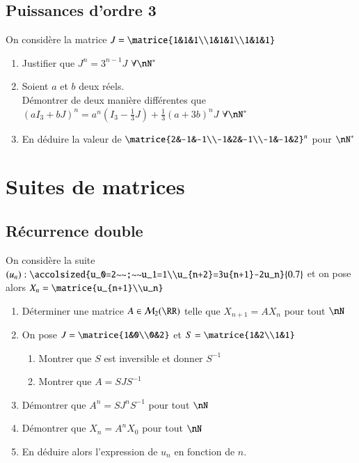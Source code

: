 \documentclass[oneside,12pt]{article}          %
\begin{document}
\subsection{Puissances d'ordre 3}
On considère la matrice $J=\matrice{1&1&1\\1&1&1\\1&1&1}$
\begin{enumerate}
    \item Justifier que $J^n=3^{n-1}J$ \quad $\forall \nN^*$
    \item Soient $a$ et $b$ deux réels.\\
    Démontrer de deux manière différentes que $(aI_3+bJ)^n=a^n(I_3-\frac{1}{3}J)+\frac{1}{3}(a+3b)^nJ$ \quad $\forall \nN^*$
    \item En déduire la valeur de $\matrice{2&-1&-1\\-1&2&-1\\-1&-1&2}^n$ pour $\nN^*$
\end{enumerate}



\section{Suites de matrices}

\subsection{Récurrence double}
On considère la suite $(u_n):\accolsized{u_0=2~~;~~u_1=1\\u_{n+2}=3u{n+1}-2u_n}{0.7}$ et on pose alors $X_n=\matrice{u_{n+1}\\u_n}$

\begin{enumerate}
 	\item Déterminer une matrice $A\in\mathcal{M}_2(\RR)$ telle que $X_{n+1}=AX_n$ pour tout $\nN$
 	\item On pose $J=\matrice{1&0\\0&2}$ et $S=\matrice{1&2\\1&1}$
 	\begin{enumerate}
 		\item Montrer que $S$ est inversible et donner $S^{-1}$
 		\item Montrer que $A=SJS^{-1}$
 	\end{enumerate}
 	\item Démontrer que $A^n=SJ^nS^{-1}$ pour tout $\nN$
 	\item Démontrer que $X_n=A^nX_0$ pour tout $\nN$
 	\item En déduire alors l'expression de $u_n$ en fonction de $n$.
\end{enumerate}
\end{document}
